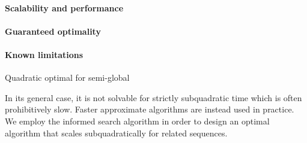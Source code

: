 \label{TRIEsec:task}

\paragraph{Scalability and performance}

\paragraph{Guaranteed optimality}

\paragraph{Known limitations}

Quadratic optimal for semi-global

In its general case, it is not solvable for strictly subquadratic time which is
often prohibitively slow. Faster approximate algorithms are instead used in
practice. We employ the \A informed search algorithm in order to design an
optimal algorithm that scales subquadratically for related sequences.
